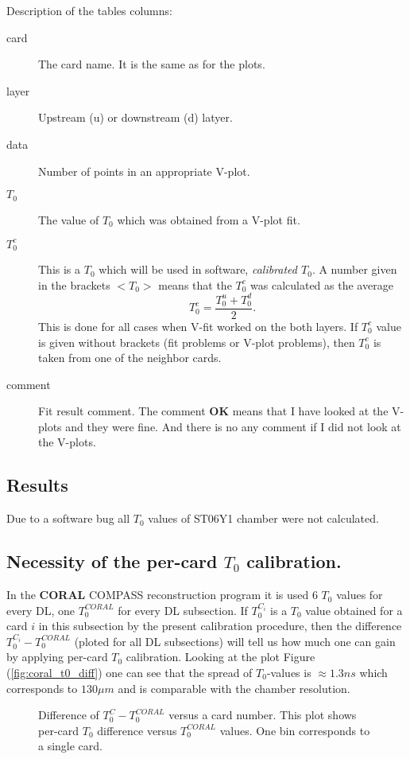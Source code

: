 \documentclass[a4paper,12pt]{article}
\begin{document}
Description of the tables columns:
\begin{description}
\item[card] The card name. It is the same as for the plots.
\item[layer] Upstream (u) or downstream (d) latyer.
\item[data] Number of points in an appropriate V-plot.
\item[$T_0$] The value of $T_0$ which was obtained from a V-plot fit.
\item[$T_0^c$] This is a $T_0$ which will be used in software, {\it calibrated $T_0$}.
A number given in the brackets $<T_0>$ means that the $T_0^c$ was calculated as
the average $$T_0^c=\frac{T_0^u+T_0^d}{2}.$$ This is done for all cases when V-fit worked
on the both layers. If $T_0^c$ value is given without brackets (fit problems or V-plot problems),
then $T_0^c$ is taken from one of the neighbor cards.
\item[comment] Fit result comment. The comment {\bf OK} means that I have
looked at the V-plots and they were fine. And there is no any comment
if I did not look at the V-plots.
\end{description}



\subsection{Results}

Due to a software bug all $T_0$ values of ST06Y1 chamber were not calculated.



\clearpage

\subsection{Necessity of the per-card $T_0$ calibration.}
In the {\bf CORAL} COMPASS reconstruction program it is used 6 $T_0$ values for every DL, one
$T_0^{CORAL}$ for every DL subsection.
If $T_0^{C_i}$ is a $T_0$ value obtained for a card $i$ in this subsection by the present
calibration procedure, then
the difference $T_0^{C_i}-T_0^{CORAL}$ (ploted for all DL subsections)
will tell us how much one can gain by applying per-card $T_0$ calibration.
Looking at the plot Figure (\ref{fig:coral_t0_diff}) one can see that the spread of
$T_0$-values is $\approx 1.3 ns$ which corresponds to $130 \mu m$ and is comparable with
the chamber resolution.

\begin{figure}[ht]
\centering
\caption{Difference of $T_0^C-T_0^{CORAL}$ versus a card number. This plot shows
per-card $T_0$ difference versus $T_0^{CORAL}$ values. One bin corresponds to
a single card.}
\label{fig:coral_t0_diff_det}
\epsfxsize=233pt 
\end{figure}
\end{document}
